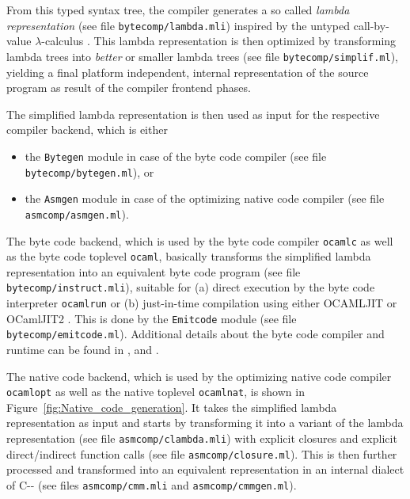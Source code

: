 \documentclass[10pt,a4paper,final,twocolumn]{article}
\begin{document}
From this typed syntax tree, the compiler generates a so called \emph{lambda representation} (see file
\texttt{bytecomp/lambda.mli}) inspired by the untyped call-by-value $\lambda$-calculus
\cite{Appel98ml,Jones87,Michaelson89}. This lambda representation is then optimized by
transforming lambda trees into \emph{better} or smaller lambda trees (see file
\texttt{bytecomp/simplif.ml}), yielding a final platform independent, internal
representation of the source program as result of the compiler frontend phases.

The simplified lambda representation is then used as input for the respective compiler
backend, which is either
\begin{itemize}
\item the \texttt{Bytegen} module in case of the byte code compiler
  (see file \texttt{bytecomp/bytegen.ml}), or
\item the \texttt{Asmgen} module in case of the optimizing native code compiler
  (see file \texttt{asmcomp/asmgen.ml}).
\end{itemize}

The byte code backend, which is used by the byte code compiler \texttt{ocamlc} as well as
the byte code toplevel \texttt{ocaml}, basically transforms the simplified lambda representation
into an equivalent byte code program (see file \texttt{bytecomp/instruct.mli}), suitable for
(a) direct execution by the byte code interpreter \texttt{ocamlrun} or (b) just-in-time
compilation using either OCAMLJIT \cite{Starynkevitch04} or OCamlJIT2
\cite{Meurer10jit,Meurer10ocamljit,Meurer11ocamljit2}.
This is done by the \texttt{Emitcode} module (see file \texttt{bytecomp/emitcode.ml}).
Additional details about the byte code compiler and runtime can be found in \cite{Leroy90},
\cite{Meurer10ocamljit} and \cite{Starynkevitch04}.

The native code backend, which is used by the optimizing native code compiler \texttt{ocamlopt}
as well as the native toplevel \texttt{ocamlnat}, is shown in Figure~\ref{fig:Native_code_generation}.
It takes the simplified lambda representation as input and starts by transforming it into a variant
of the lambda representation (see file \texttt{asmcomp/clambda.mli}) with explicit closures and
explicit direct/indirect function calls (see file \texttt{asmcomp/closure.ml}). This is then further
processed and transformed into an equivalent representation in an internal dialect of C\mbox{-}\mbox{-}
\cite{JonesR98,JonesRR99} (see files \texttt{asmcomp/cmm.mli} and \texttt{asmcomp/cmmgen.ml}).
\end{document}
